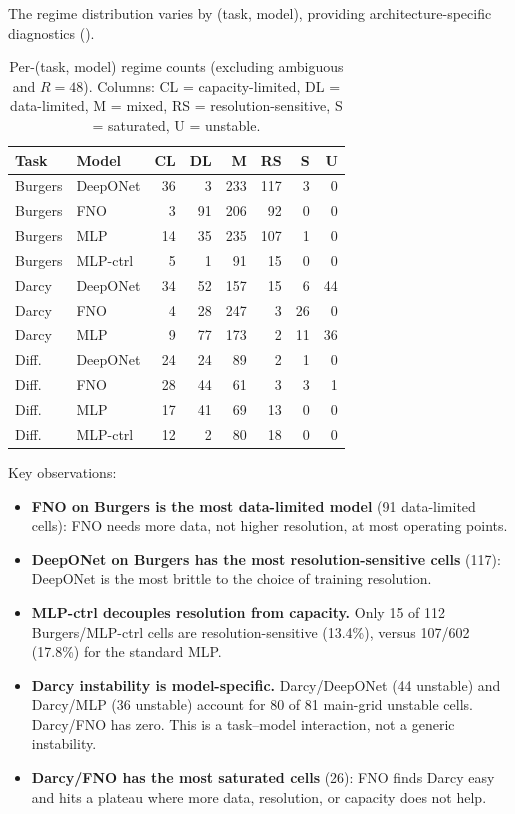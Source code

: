 \documentclass[11pt]{article}
\begin{document}
The regime distribution varies by (task, model), providing
architecture-specific diagnostics ().

\begin{table}[h]
\centering
\caption{Per-(task, model) regime counts (excluding
ambiguous and $R{=}48$). Columns: CL = capacity-limited,
DL = data-limited, M = mixed, RS = resolution-sensitive,
S = saturated, U = unstable.}
\label{tab:regime-by-model}
\small
\begin{tabular}{@{}llrrrrrr@{}}
\toprule
\textbf{Task} & \textbf{Model} & CL & DL & M & RS & S & U \\
\midrule
Burgers & DeepONet      & 36 &  3 & 233 & 117 & 3 & 0 \\
Burgers & FNO           &  3 & 91 & 206 &  92 & 0 & 0 \\
Burgers & MLP           & 14 & 35 & 235 & 107 & 1 & 0 \\
Burgers & MLP-ctrl      &  5 &  1 &  91 &  15 & 0 & 0 \\
Darcy   & DeepONet      & 34 & 52 & 157 &  15 & 6 & 44 \\
Darcy   & FNO           &  4 & 28 & 247 &   3 & 26 & 0 \\
Darcy   & MLP           &  9 & 77 & 173 &   2 & 11 & 36 \\
Diff.   & DeepONet      & 24 & 24 &  89 &   2 & 1 & 0 \\
Diff.   & FNO           & 28 & 44 &  61 &   3 & 3 & 1 \\
Diff.   & MLP           & 17 & 41 &  69 &  13 & 0 & 0 \\
Diff.   & MLP-ctrl      & 12 &  2 &  80 &  18 & 0 & 0 \\
\bottomrule
\end{tabular}
\end{table}

Key observations:
\begin{itemize}
  \item \textbf{FNO on Burgers is the most data-limited model}
    (91 data-limited cells): FNO needs more data, not higher
    resolution, at most operating points.
  \item \textbf{DeepONet on Burgers has the most resolution-sensitive
    cells} (117): DeepONet is the most brittle to the choice of
    training resolution.
  \item \textbf{MLP-ctrl decouples resolution from capacity.}
    Only 15 of 112 Burgers/MLP-ctrl cells are resolution-sensitive
    (13.4\%), versus 107/602 (17.8\%) for the standard MLP.
  \item \textbf{Darcy instability is model-specific.} Darcy/DeepONet
    (44 unstable) and Darcy/MLP (36 unstable) account for 80 of 81
    main-grid unstable cells. Darcy/FNO has zero. This is a task--model
    interaction, not a generic instability.
  \item \textbf{Darcy/FNO has the most saturated cells} (26): FNO
    finds Darcy easy and hits a plateau where more data, resolution,
    or capacity does not help.
\end{itemize}
\end{document}
